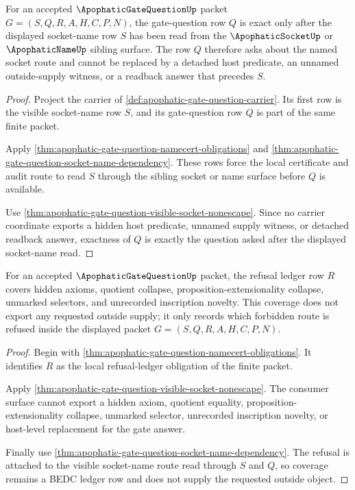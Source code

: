 \begin{theorem}
\label{thm:apophatic-gate-question-source-gate-exactness}
For an accepted $\ApophaticGateQuestionUp$ packet $G=(S,Q,R,A,H,C,P,N)$, the gate-question row $Q$ is exact only after the displayed socket-name row $S$ has been read from the $\ApophaticSocketUp$ or $\ApophaticNameUp$ sibling surface. The row $Q$ therefore asks about the named socket route and cannot be replaced by a detached host predicate, an unnamed outside-supply witness, or a readback answer that precedes $S$.
\end{theorem}
\begin{proof}
Project the carrier of \autoref{def:apophatic-gate-question-carrier}. Its first row is the visible socket-name row $S$, and its gate-question row $Q$ is part of the same finite packet.

Apply \autoref{thm:apophatic-gate-question-namecert-obligations} and \autoref{thm:apophatic-gate-question-socket-name-dependency}. These rows force the local certificate and audit route to read $S$ through the sibling socket or name surface before $Q$ is available.

Use \autoref{thm:apophatic-gate-question-visible-socket-nonescape}. Since no carrier coordinate exports a hidden host predicate, unnamed supply witness, or detached readback answer, exactness of $Q$ is exactly the question asked after the displayed socket-name read.
\end{proof}

\begin{theorem}
\label{thm:apophatic-gate-question-refusal-nonescape-coverage}
For an accepted $\ApophaticGateQuestionUp$ packet, the refusal ledger row $R$ covers hidden axioms, quotient collapse, proposition-extensionality collapse, unmarked selectors, and unrecorded inscription novelty. This coverage does not export any requested outside supply; it only records which forbidden route is refused inside the displayed packet $G=(S,Q,R,A,H,C,P,N)$.
\end{theorem}
\begin{proof}
Begin with \autoref{thm:apophatic-gate-question-namecert-obligations}. It identifies $R$ as the local refusal-ledger obligation of the finite packet.

Apply \autoref{thm:apophatic-gate-question-visible-socket-nonescape}. The consumer surface cannot export a hidden axiom, quotient equality, proposition-extensionality collapse, unmarked selector, unrecorded inscription novelty, or host-level replacement for the gate answer.

Finally use \autoref{thm:apophatic-gate-question-socket-name-dependency}. The refusal is attached to the visible socket-name route read through $S$ and $Q$, so coverage remains a BEDC ledger row and does not supply the requested outside object.
\end{proof}

